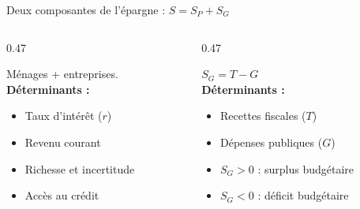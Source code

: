 \documentclass[aspectratio=169]{beamer}
\begin{document}
\begin{frame}[t]{Deux composantes de l'épargne : $S = S_P + S_G$}\examtag
   \vspace{0.1cm}
   \begin{columns}[T]
      \begin{column}{0.47\textwidth}
         \begin{defbox}
            \footnotesize
            Ménages + entreprises.\\[4pt]
            \textbf{Déterminants :}
            \begin{itemize}
               \setlength\itemsep{0.08cm}
               \item Taux d'intérêt ($r$)
               \item Revenu courant
               \item Richesse et incertitude
               \item Accès au crédit
            \end{itemize}
         \end{defbox}
      \end{column}
      \begin{column}{0.47\textwidth}
         \begin{defbox}
            \footnotesize
            $S_G = T - G$\\[4pt]
            \textbf{Déterminants :}
            \begin{itemize}
               \setlength\itemsep{0.08cm}
               \item Recettes fiscales ($T$)
               \item Dépenses publiques ($G$)
               \item $S_G > 0$ : surplus budgétaire
               \item $S_G < 0$ : déficit budgétaire
            \end{itemize}
         \end{defbox}
      \end{column}
   \end{columns}
\end{frame}
\end{document}

